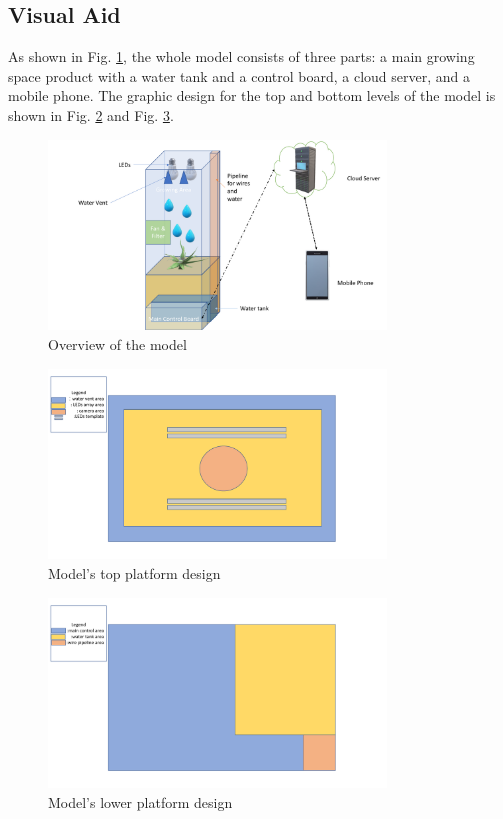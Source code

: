 \subsection{Visual Aid}
As shown in Fig. \ref{fig:visual_overview}, the whole model consists of three parts: a main growing space product with a water tank and a control board, a cloud server, and a mobile phone. The graphic design for the top and bottom levels of the model is shown in Fig. \ref{fig:visual_up} and Fig. \ref{fig:visual_low}.
\begin{figure}[!htb]
\centering
\includegraphics[width=0.8\textwidth]{Figure/visual_overview.pdf}
\caption{Overview of the model}
\label{fig:visual_overview}
\end{figure}

\begin{figure}[!htb]
\centering
\includegraphics[width=0.8\textwidth]{Figure/upper_level.pdf}
\caption{Model's top platform design}
\label{fig:visual_up}
\end{figure}

\begin{figure}[!htb]
\centering
\includegraphics[width=0.8\textwidth]{Figure/lower_level.pdf}
\caption{Model's lower platform design}
\label{fig:visual_low}
\end{figure}

